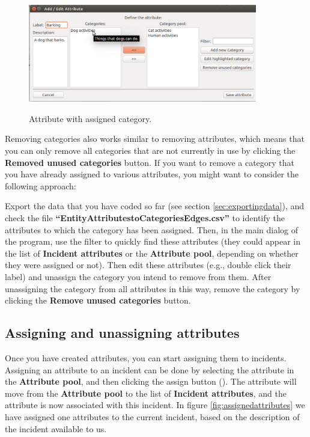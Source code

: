 \documentclass{memoir}
\begin{document}
\begin{figure}[h!]
  \centering
  \caption{Attribute with assigned category.}
  \includegraphics[width=100mm]{Screenshot_12.pdf}
  \label{fig:attributedialogwithcategories}
\end{figure}

Removing categories also works similar to removing attributes, which means that you can only remove all categories that are not currently in use by clicking the \textbf{Removed unused categories} button. If you want to remove a category that you have already assigned to various attributes, you might want to consider the following approach:

Export the data that you have coded so far (see section \ref{sec:exportingdata}), and check the file \textbf{``Entity\textunderscore Attributes\textunderscore to\textunderscore Categories\textunderscore Edges.csv''} to identify the attributes to which the category has been assigned. Then, in the main dialog of the program, use the filter to quickly find these attributes (they could appear in the list of \textbf{Incident attributes} or the \textbf{Attribute pool}, depending on whether they were assigned or not). Then edit these attributes (e.g., double click their label) and unassign the category you intend to remove from them. After unassigning the category from all attributes in this way, remove the category by clicking the \textbf{Remove unused categories} button.

\subsection{Assigning and unassigning attributes}
\label{sec:assigningunassigningattributes}

Once you have created attributes, you can start assigning them to incidents. Assigning an attribute to an incident can be done by selecting the attribute in the \textbf{Attribute pool}, and then clicking the assign button (\textbf{\guillemotleft}). The attribute will move from the \textbf{Attribute pool} to the list of \textbf{Incident attributes}, and the attribute is now associated with this incident. In figure \ref{fig:assignedattributes} we have assigned one attributes to the current incident, based on the description of the incident available to us.
\end{document}
